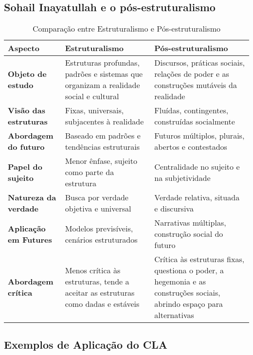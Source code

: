 \subsection{Sohail Inayatullah e o pós-estruturalismo}
\begin{table}[h!]
\centering
\renewcommand{\arraystretch}{1.5}
\begin{tabularx}{\textwidth}{>{\bfseries}l X X}
\toprule
\textbf{Aspecto} & \textbf{Estruturalismo} & \textbf{Pós-estruturalismo} \\
\midrule
Objeto de estudo & Estruturas profundas, padrões e sistemas que organizam a realidade social e cultural & Discursos, práticas sociais, relações de poder e as construções mutáveis da realidade \\
\midrule
Visão das estruturas & Fixas, universais, subjacentes à realidade & Fluídas, contingentes, construídas socialmente \\
\midrule
Abordagem do futuro & Baseado em padrões e tendências estruturais & Futuros múltiplos, plurais, abertos e contestados \\
\midrule
Papel do sujeito & Menor ênfase, sujeito como parte da estrutura & Centralidade no sujeito e na subjetividade \\
\midrule
Natureza da verdade & Busca por verdade objetiva e universal & Verdade relativa, situada e discursiva \\
\midrule
Aplicação em Futures & Modelos previsíveis, cenários estruturados & Narrativas múltiplas, construção social do futuro \\
\midrule
Abordagem crítica & Menos crítica às estruturas, tende a aceitar as estruturas como dadas e estáveis & Crítica às estruturas fixas, questiona o poder, a hegemonia e as construções sociais, abrindo espaço para alternativas \\
\bottomrule
\end{tabularx}
\caption{Comparação entre Estruturalismo e Pós-estruturalismo}
\end{table}


\subsection{Exemplos de Aplicação do CLA}





\sectionbreak